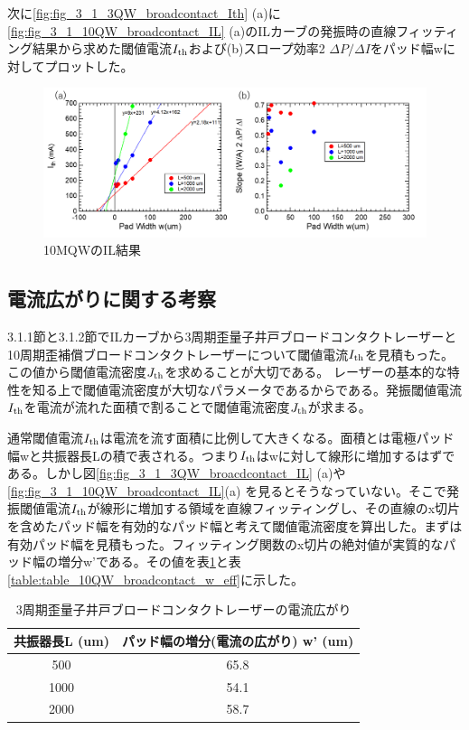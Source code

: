 次に\ref{fig:fig_3_1_3QW_broadcontact_Ith} (a)に\ref{fig:fig_3_1_10QW_broadcontact_IL} (a)のILカーブの発振時の直線フィッティング結果から求めた閾値電流$I_{\rm{th}}$および(b)スロープ効率2 $\Delta P/\Delta I$をパッド幅wに対してプロットした。
\begin{figure}[h]
	\centering
	\includegraphics[width=15cm]{figure/fig_3_1_10QW_broadcontact_Ith.png}
		\caption{10MQWのIL結果}
		\label{fig:fig_3_1_10QW_broadcontact_Ith}
\end{figure}

\subsection{電流広がりに関する考察}%
3.1.1節と3.1.2節でILカーブから3周期歪量子井戸ブロードコンタクトレーザーと10周期歪補償ブロードコンタクトレーザーについて閾値電流$I_{\rm{th}}$を見積もった。この値から閾値電流密度$J_{\rm{th}}$を求めることが大切である。
レーザーの基本的な特性を知る上で閾値電流密度が大切なパラメータであるからである。発振閾値電流$I_{\rm{th}}$を電流が流れた面積で割ることで閾値電流密度$J_{\rm{th}}$が求まる。

通常閾値電流$I_{\rm{th}}$は電流を流す面積に比例して大きくなる。面積とは電極パッド幅wと共振器長Lの積で表される。つまり$I_{\rm{th}}$はwに対して線形に増加するはずである。しかし図\ref{fig:fig_3_1_3QW_broacdcontact_IL} (a)や\ref{fig:fig_3_1_10QW_broadcontact_IL}(a) を見るとそうなっていない。そこで発振閾値電流$I_{\rm{th}}$が線形に増加する領域を直線フィッティングし、その直線のx切片を含めたパッド幅を有効的なパッド幅と考えて閾値電流密度を算出した。まずは有効パッド幅を見積もった。フィッティング関数のx切片の絶対値が実質的なパッド幅の増分w'である。その値を表\ref{table:table_3QW_broadcontact_w_eff}と表\ref{table:table_10QW_broadcontact_w_eff}に示した。
\begin{table}[h]
  \caption{3周期歪量子井戸ブロードコンタクトレーザーの電流広がり}
  \label{table:table_3QW_broadcontact_w_eff}
  \centering
  \begin{tabular}{cc}
    \hline
    共振器長L (um)  & パッド幅の増分(電流の広がり) w' (um)   \\
    \hline \hline
     500 & 65.8  \\
    1000  & 54.1 \\
    2000  & 58.7 \\ 
    \hline
  \end{tabular}
\end{table}

